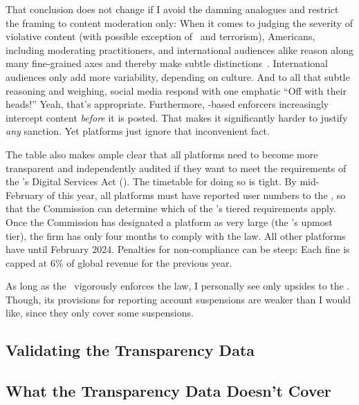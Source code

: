 That conclusion does not change if I avoid the damning analogues and restrict
the framing to content moderation only: When it comes to judging the severity of
violative content (with possible exception of \CSAM\ and terrorism), Americans,
including moderating practitioners, and international audiences alike reason
along many fine-grained axes and thereby make subtle
distinctions~\cite{JiangScheuermanea2021,ScheuermanJiangea2021}. International
audiences only add more variability, depending on culture. And to all that
subtle reasoning and weighing, social media respond with one emphatic ``Off with
their heads!'' Yeah, that's appropriate. Furthermore, \AI{}-based enforcers
increasingly intercept content \emph{before} it is posted. That makes it
significantly harder to justify \emph{any} sanction. Yet platforms just ignore
that inconvenient fact.

The table also makes ample clear that all platforms need to become more
transparent and independently audited if they want to meet the requirements of
the \EU's Digital Services Act (\DSA). The timetable for doing so is tight. By
mid-February of this year, all platforms must have reported user numbers to the
\EU, so that the Commission can determine which of the \DSA's tiered
requirements apply. Once the Commission has designated a platform as very large
(the \DSA's upmost tier), the firm has only four months to comply with the law.
All other platforms have until February 2024. Penalties for non-compliance can
be steep: Each fine is capped at 6\% of global revenue for the previous year.

As long as the \EU\ vigorously enforces the law, I personally see only upsides
to the \DSA. Though, its provisions for reporting account suspensions are weaker
than I would like, since they only cover some suspensions.


\subsection{Validating the Transparency Data}
\label{sec:census:validation}




\subsection{What the Transparency Data Doesn't Cover}
\label{sec:census:limits}

